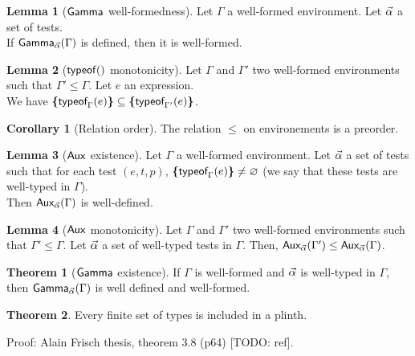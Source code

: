 \documentclass[a4paper]{article}
\theoremstyle{definition}
\newtheorem{theorem}{Theorem}
\newtheorem{lemma}{Lemma}
\newtheorem{corollary}{Corollary}
\begin{document}
        \begin{lemma}[$\textsf{Gamma}_{} $ well-formedness]
          Let $\Gamma$ a well-formed environment. Let $\vec \alpha$ a set of tests.\\
          If $\textsf{Gamma}_{\vec \alpha}(\Gamma)$ is defined, then it is well-formed.
        \end{lemma}

        \begin{lemma}[$\textsf{typeof}_{}()$ monotonicity]
          Let $\Gamma$ and $\Gamma'$ two well-formed environments such that $\Gamma' \leq \Gamma$.
          Let $e$ an expression.\\
          We have $\textbf{\{}\textsf{typeof}_{\Gamma}(e)\textbf{\}} \subseteq \textbf{\{}\textsf{typeof}_{\Gamma'}(e)\textbf{\}}$.
        \end{lemma}

        \begin{corollary}[Relation order]
          The relation $\leq$ on environements is a preorder.
        \end{corollary}

        \begin{lemma}[$\textsf{Aux}_{} $ existence]
          Let $\Gamma$ a well-formed environment.
          Let $\vec \alpha$ a set of tests such that for each test $(e,t,p)$, $\textbf{\{}\textsf{typeof}_{\Gamma}(e)\textbf{\}} \neq \varnothing$
          (we say that these tests are well-typed in $\Gamma$).\\
          Then $\textsf{Aux}_{\vec \alpha}(\Gamma)$ is well-defined.
        \end{lemma}

        \begin{lemma}[$\textsf{Aux}_{}$ monotonicity]
          Let $\Gamma$ and $\Gamma'$ two well-formed environments such that $\Gamma' \leq \Gamma$.
          Let $\vec \alpha$ a set of well-typed tests in $\Gamma$. Then, $\textsf{Aux}_{\vec \alpha}(\Gamma') \leq \textsf{Aux}_{\vec \alpha}(\Gamma)$.
        \end{lemma}

        \begin{theorem}[$\textsf{Gamma}_{}$ existence]
            If $\Gamma$ is well-formed and $\vec \alpha$ is well-typed in $\Gamma$, then $\textsf{Gamma}_{\vec \alpha}(\Gamma)$ is well defined and well-formed.
        \end{theorem}

        \begin{theorem}
          Every finite set of types is included in a plinth.
        \end{theorem}
        Proof: Alain Frisch thesis, theorem 3.8 (p64) [TODO: ref].
\end{document}
